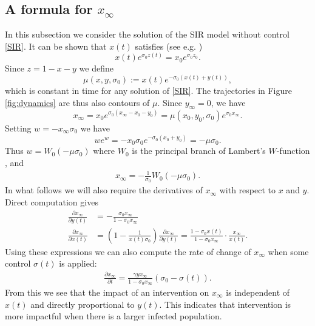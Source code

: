 \documentclass[english,12pt,letter]{article}
\newcommand{\Rnot}{\sigma_0}
\newcommand{\Sinf}{x_\infty}
\begin{document}
\subsection{A formula for $\Sinf$}
In this subsection we consider the solution of the SIR model without
control \eqref{SIR}.
It can be shown that $x(t)$ satisfies (see e.g. \cite{harko2014exact,pakes2015lambert})
$$
    x(t)e^{\Rnot z(t)} = x_0 e^{\Rnot z_0}.
$$
Since $z=1-x-y$ we define
$$
   \mu(x,y,\Rnot) := x(t) e^{-\Rnot(x(t)+y(t))},
$$
which is constant in time for any solution of \eqref{SIR}.
The trajectories in Figure \ref{fig:dynamics} are thus also contours of $\mu$.
Since $y_\infty=0$, we have
$$
    x_\infty = x_0 e^{\Rnot(x_\infty-x_0-y_0)} = \mu(x_0,y_0,\Rnot) e^{\Rnot x_\infty}.
$$
Setting $w=-x_\infty \Rnot$ we have
$$
    we^w = -x_0 \Rnot e^{-\Rnot(x_0+y_0)} = -\mu \Rnot.
$$
Thus $w = W_0(-\mu\Rnot)$ where $W_0$ is the principal branch of Lambert's $W$-function \cite{pakes2015lambert},
and
\begin{align} \label{eq:xinf}
    x_\infty = -\frac{1}{\Rnot}W_0(-\mu \Rnot).
\end{align}
In what follows we will also require the derivatives of $\Sinf$ with respect to $x$ and $y$.
Direct computation gives
\begin{subequations} \label{xinf-grad}
\begin{align}
    \frac{\partial \Sinf}{\partial y(t)} & = -\frac{\Rnot \Sinf}{1-\Rnot \Sinf} \\
    \frac{\partial \Sinf}{\partial x(t)} & = \left(1-\frac{1}{x(t)\Rnot}\right) \frac{\partial \Sinf}{\partial y(t)}
      = \frac{1-\Rnot x(t)}{1-\Rnot \Sinf} \cdot \frac{\Sinf}{x(t)}.
\end{align}
\end{subequations}
Using these expressions we can also compute the rate of change of $\Sinf$ when some
control $\sigma(t)$ is applied:
\begin{align} \label{dxinf-dt}
    \frac{\partial \Sinf}{\partial t} = \frac{\gamma y \Sinf}{1-\Rnot\Sinf}(\Rnot - \sigma(t)).
\end{align}
From this we see that the impact of an intervention on $\Sinf$ is independent of $x(t)$ and
directly proportional to $y(t)$.  This indicates that intervention is more impactful
when there is a larger infected population.
%
%
\end{document}
